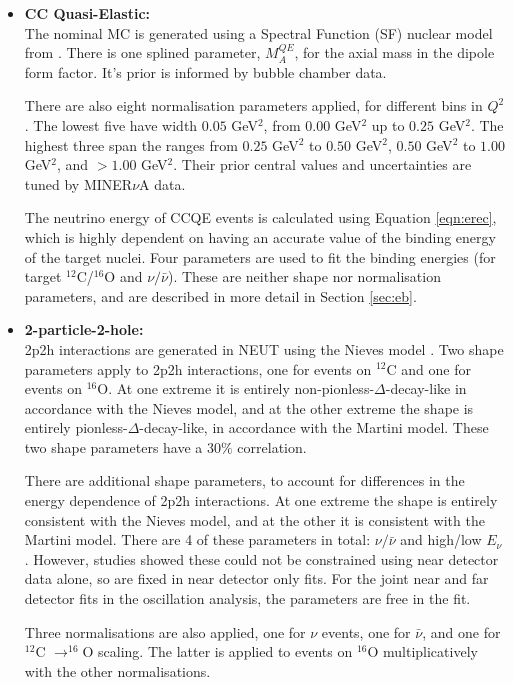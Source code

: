 \begin{itemize}

\item \textbf{CC Quasi-Elastic:}\\
The nominal MC is generated using a Spectral Function (SF) nuclear model from \cite{benhar}. There is one splined parameter, $M^{QE}_{A}$, for the axial mass in the dipole form factor. It's prior is informed by bubble chamber data\cite{tn344}. 

There are also eight normalisation parameters applied, for different bins in $Q^2$. The lowest five have width $0.05$ GeV$^2$, from $0.00$ GeV$^2$ up to $0.25$ GeV$^2$. The highest three span the ranges from $0.25$ GeV$^2$ to $0.50$ GeV$^2$, $0.50$ GeV$^2$ to $1.00$ GeV$^2$, and $>1.00$ GeV$^2$. Their prior central values and uncertainties are tuned by MINER$\nu$A data. 

The neutrino energy of CCQE events is calculated using Equation \ref{eqn:erec}, which is highly dependent on having an accurate value of the binding energy of the target nuclei. Four parameters are used to fit the binding energies (for target $^{12}$C/$^{16}$O and $\nu/\bar{\nu}$). These are neither shape nor normalisation parameters, and are described in more detail in Section \ref{sec:eb}.

\item \textbf{2-particle-2-hole:}\\
2p2h interactions are generated in NEUT using the Nieves model \cite{Nieves}. Two shape parameters apply to 2p2h interactions, one for events on $^{12}$C and one for events on $^{16}$O.  At one extreme it is entirely non-pionless-$\Delta$-decay-like in accordance with the Nieves model, and at the other extreme the shape is entirely pionless-$\Delta$-decay-like, in accordance with the Martini model\cite{Martini}. These two shape parameters have a 30$\%$ correlation.

There are additional shape parameters, to account for differences in the energy dependence of 2p2h interactions. At one extreme the shape is entirely consistent with the Nieves model, and at the other it is consistent with the Martini model. There are 4 of these parameters in total: $\nu/\bar{\nu}$ and high/low $E_{\nu}$. However, studies showed these could not be constrained using near detector data alone, so are fixed in near detector only fits. For the joint near and far detector fits in the oscillation analysis, the parameters are free in the fit. 

Three normalisations are also applied, one for $\nu$ events, one for $\bar{\nu}$, and one for $^{12}$C $\rightarrow ^{16}$O scaling. The latter is applied to events on $^{16}$O multiplicatively with the other normalisations.


\end{itemize}

